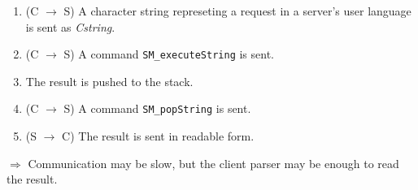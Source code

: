 \begin{slide}{}

\begin{enumerate}
\item (C $\rightarrow$ S) A character string represeting a request in a server's
user language is sent as {\sl Cstring}.
\item (C $\rightarrow$ S) A command {\tt SM\_executeString} is sent.
\item The result is pushed to the stack.
\item (C $\rightarrow$ S) A command {\tt SM\_popString} is sent.
\item (S $\rightarrow$ C) The result is sent in readable form.
\end{enumerate}

$\Rightarrow$ Communication may be slow, but the client parser may be
enough to read the result.
\end{slide}

